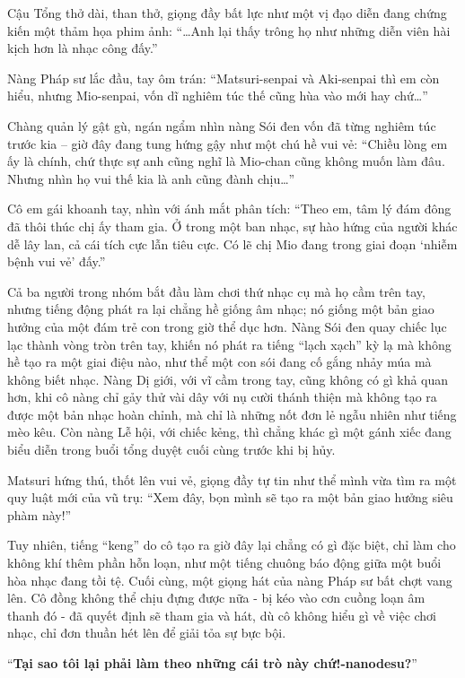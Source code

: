 \documentclass[../main.tex]{subfiles}
\begin{document}
Cậu Tổng thở dài, than thở, giọng đầy bất lực như một vị đạo diễn đang chứng kiến một thảm họa phim ảnh: ``\dots Anh lại thấy trông họ như những diễn viên hài kịch hơn là nhạc công đấy.''

Nàng Pháp sư lắc đầu, tay ôm trán: ``Matsuri-senpai và Aki-senpai thì em còn hiểu, nhưng Mio-senpai, vốn dĩ nghiêm túc thế cũng hùa vào mới hay chứ\dots''

Chàng quản lý gật gù, ngán ngẩm nhìn nàng Sói đen vốn đã từng nghiêm túc trước kia – giờ đây đang tung hứng gậy như một chú hề vui vẻ: ``Chiều lòng em ấy là chính, chứ thực sự anh cũng nghĩ là Mio-chan cũng không muốn làm đâu. Nhưng nhìn họ vui thế kia là anh cũng đành chịu\dots''

Cô em gái khoanh tay, nhìn với ánh mắt phân tích: ``Theo em, tâm lý đám đông đã thôi thúc chị ấy tham gia. Ở trong một ban nhạc, sự hào hứng của người khác dễ lây lan, cả cái tích cực lẫn tiêu cực. Có lẽ chị Mio đang trong giai đoạn `nhiễm bệnh vui vẻ' đấy.''

Cả ba người trong nhóm bắt đầu làm chơi thứ nhạc cụ mà họ cầm trên tay, nhưng tiếng động phát ra lại chẳng hề giống âm nhạc; nó giống một bản giao hưởng của một đám trẻ con trong giờ thể dục hơn. Nàng Sói đen quay chiếc lục lạc thành vòng tròn trên tay, khiến nó phát ra tiếng ``lạch xạch'' kỳ lạ mà không hề tạo ra một giai điệu nào, như thể một con sói đang cố gắng nhảy múa mà không biết nhạc. Nàng Dị giới, với vĩ cầm trong tay, cũng không có gì khả quan hơn, khi cô nàng chỉ gảy thử vài dây với nụ cười thánh thiện mà không tạo ra được một bản nhạc hoàn chỉnh, mà chỉ là những nốt đơn lẻ ngẫu nhiên như tiếng mèo kêu. Còn nàng Lễ hội, với chiếc kẻng, thì chẳng khác gì một gánh xiếc đang biểu diễn trong buổi tổng duyệt cuối cùng trước khi bị hủy.

Matsuri hứng thú, thốt lên vui vẻ, giọng đầy tự tin như thể mình vừa tìm ra một quy luật mới của vũ trụ: ``Xem đây, bọn mình sẽ tạo ra một bản giao hưởng siêu phàm này!''

Tuy nhiên, tiếng ``keng'' do cô tạo ra giờ đây lại chẳng có gì đặc biệt, chỉ làm cho không khí thêm phần hỗn loạn, như một tiếng chuông báo động giữa một buổi hòa nhạc đang tồi tệ. Cuối cùng, một giọng hát của nàng Pháp sư bất chợt vang lên. Cô đồng không thể chịu đựng được nữa - bị kéo vào cơn cuồng loạn âm thanh đó - đã quyết định sẽ tham gia và hát, dù cô không hiểu gì về việc chơi nhạc, chỉ đơn thuần hét lên để giải tỏa sự bực bội.

``\textbf{Tại sao tôi lại phải làm theo những cái trò này chứ!-nanodesu?}''
\end{document}

